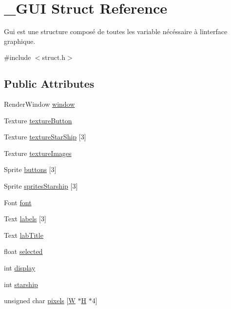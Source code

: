 \hypertarget{struct___g_u_i}{}\section{\+\_\+\+G\+UI Struct Reference}
\label{struct___g_u_i}


Gui est une structure composé de toutes les variable nécéssaire à linterface graphique.  




{\ttfamily \#include $<$struct.\+h$>$}

\subsection*{Public Attributes}
\begin{DoxyCompactItemize}
\item 
Render\+Window \hyperlink{struct___g_u_i_a7466f3e309fdfed204b5b0131506f0fb}{window}
\item 
Texture \hyperlink{struct___g_u_i_a9d68467300f6039050af8f2950cc8021}{texture\+Button}
\item 
Texture \hyperlink{struct___g_u_i_a4cf2c74cbae665b04f9663c001994996}{texture\+Star\+Ship} \mbox{[}3\mbox{]}
\item 
Texture \hyperlink{struct___g_u_i_a57be58f1d814a11dc84161cc2a485d68}{texture\+Images}
\item 
Sprite \hyperlink{struct___g_u_i_a3ad6a016469abb960aca20f8dfa8ef30}{buttons} \mbox{[}3\mbox{]}
\item 
Sprite \hyperlink{struct___g_u_i_a6ff2172df7d8b7729200ea24148110a1}{sprites\+Starship} \mbox{[}3\mbox{]}
\item 
Font \hyperlink{struct___g_u_i_a57e7251e818576e9b17dd162f680d535}{font}
\item 
Text \hyperlink{struct___g_u_i_a9eb208efe8d282d8e894d1a470913091}{labels} \mbox{[}3\mbox{]}
\item 
Text \hyperlink{struct___g_u_i_ac071b81e22679f8a23e323288a3b83d5}{lab\+Title}
\item 
float \hyperlink{struct___g_u_i_aa43c86faaad13f5f449b1dca0cbd5284}{selected}
\item 
int \hyperlink{struct___g_u_i_a8c72fa2b601a788e3e182eb2f88c8787}{display}
\item 
int \hyperlink{struct___g_u_i_a00234ae245e91bfcdc4997cbfd8d275d}{starship}
\item 
unsigned char \hyperlink{struct___g_u_i_a67e0559e0707a7f3aa71f40c7ce55588}{pixels} \mbox{[}\hyperlink{struct_8h_a649b8f01fd6c0f47ff3cbddaeba63bfb}{W} $\ast$\hyperlink{struct_8h_abec92cc72a096640b821b8cd56a02495}{H} $\ast$4\mbox{]}
\end{DoxyCompactItemize}


